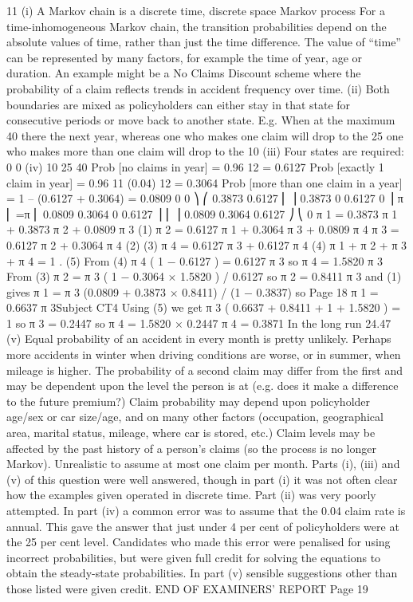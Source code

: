 11
(i)
A Markov chain is a discrete time, discrete space Markov process
For a time-inhomogeneous Markov chain, the transition probabilities depend on the
absolute values of time, rather than just the time difference.
The value of “time” can be represented by many factors, for example the time of year,
age or duration.
An example might be a No Claims Discount scheme where the probability of a claim
reflects trends in accident frequency over time.
(ii)
Both boundaries are mixed as policyholders can either stay in that state for
consecutive periods or move back to another state.
E.g. When at the maximum 40%
there the next year, whereas one who makes one claim will drop to the 25%
one who makes more than one claim will drop to the 10%
(iii)
Four states are required: 0%
0%
(iv)
10%
25%
40%
Prob [no claims in year] = 0.96 12 = 0.6127
Prob [exactly 1 claim in year] = 0.96 11 (0.04) 12 = 0.3064
Prob [more than one claim in a year] = 1 – (0.6127 + 0.3064) = 0.0809
0
0 ⎞
⎛ 0.3873 0.6127
⎜
⎟
0.3873
0
0.6127
0 ⎟
π ⎜
=π
⎜ 0.0809 0.3064
0
0.6127 ⎟
⎜
⎟
0.0809 0.3064 0.6127 ⎠
⎝ 0
π 1 = 0.3873 π 1 + 0.3873 π 2 + 0.0809 π 3 (1)
π 2 = 0.6127 π 1 + 0.3064 π 3 + 0.0809 π 4
π 3 = 0.6127 π 2 + 0.3064 π 4 (2)
(3)
π 4 = 0.6127 π 3 + 0.6127 π 4 (4)
π 1 + π 2 + π 3 + π 4 = 1 . (5)
From (4) π 4 ( 1 − 0.6127 ) = 0.6127 π 3
so π 4 = 1.5820 π 3
From (3) π 2 = π 3 ( 1 − 0.3064 × 1.5820 ) / 0.6127
so π 2 = 0.8411 π 3
and (1) gives π 1 = π 3 (0.0809 + 0.3873 × 0.8411) / (1 − 0.3837)
so
Page 18
π 1 = 0.6637 π 3Subject CT4 %
Using (5) we get π 3 ( 0.6637 + 0.8411 + 1 + 1.5820 ) = 1
so π 3 = 0.2447
so π 4 = 1.5820 × 0.2447
π 4 = 0.3871
In the long run 24.47%
(v)
Equal probability of an accident in every month is pretty unlikely.
Perhaps more accidents in winter when driving conditions are worse, or in summer,
when mileage is higher.
The probability of a second claim may differ from the first and may be dependent
upon the level the person is at (e.g. does it make a difference to the future premium?)
Claim probability may depend upon policyholder age/sex or car size/age, and on
many other factors (occupation, geographical area, marital status, mileage, where car
is stored, etc.)
Claim levels may be affected by the past history of a person's claims (so the process is
no longer Markov).
Unrealistic to assume at most one claim per month.
Parts (i), (iii) and (v) of this question were well answered, though in part (i) it was not often
clear how the examples given operated in discrete time. Part (ii) was very poorly attempted.
In part (iv) a common error was to assume that the 0.04 claim rate is annual. This gave the
answer that just under 4 per cent of policyholders were at the 25 per cent level. Candidates
who made this error were penalised for using incorrect probabilities, but were given full
credit for solving the equations to obtain the steady-state probabilities. In part (v) sensible
suggestions other than those listed were given credit.
END OF EXAMINERS’ REPORT
Page 19
